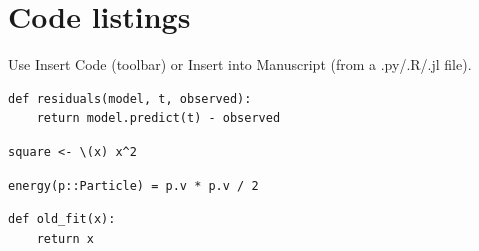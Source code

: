 \documentclass{article}
\begin{document}
\section{Code listings}

Use Insert Code (toolbar) or Insert into Manuscript (from a .py/.R/.jl file).

\begin{verbatim}
def residuals(model, t, observed):
    return model.predict(t) - observed
\end{verbatim}

\begin{verbatim}
square <- \(x) x^2
\end{verbatim}

\begin{verbatim}
energy(p::Particle) = p.v * p.v / 2
\end{verbatim}

\begin{verbatim}
def old_fit(x):
    return x
\end{verbatim}
\end{document}
